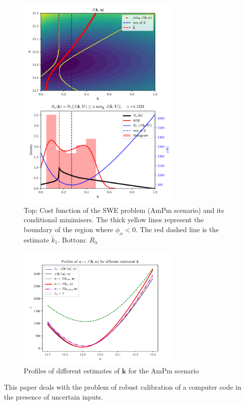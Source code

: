 \documentclass[npg, manuscript]{copernicus}
\begin{document}
\begin{figure}[h]
\includegraphics[width=8cm]{Figures/SWE_AmPm3.pdf}
\caption{Top: Cost function of the SWE problem (AmPm scenario) and its conditional minimisers. The thick yellow lines represent the boundary of the region where $\phi_\alpha<0$. The red dashed line is the estimate $\check{k}_{1}$. Bottom: $R_{\check{\alpha}}$}
\label{fig:SWE_checkalphaAmPm}
\end{figure}

\begin{figure}[h]
  \centering
  \includegraphics[width=8cm]{Figures/SWE_AmPm_profile.pdf}
  \caption{Profiles of different estimates of $\mathbf{k}$ for the AmPm scenario}
  \label{fig:SWE_profilesAmPm}
\end{figure}

\clearpage
\conclusions  %
This paper deals with the problem of robust calibration of a computer code in the presence of uncertain inputs. 
\end{document}
